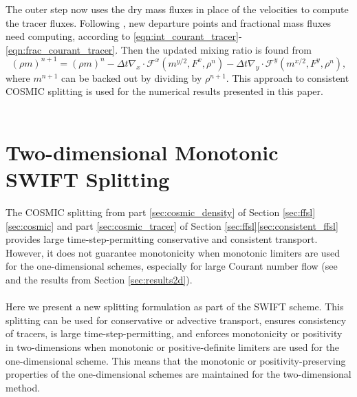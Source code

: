 \documentclass{ametsocV6.1}
\begin{document}
The outer step now uses the dry mass fluxes in place of the velocities to compute the tracer fluxes.
Following \citet{skamarock2006limiters}, new departure points and fractional mass fluxes need computing, according to \eqref{eqn:int_courant_tracer}-\eqref{eqn:frac_courant_tracer}.
Then the updated mixing ratio is found from
\begin{equation} \label{eqn:cosmic_tracer_end}
   (\rho m)^{n+1} = (\rho m)^{n} - \Delta{t} \nabla_x\cdot \mathcal{F}^x(m^{y/2},F^x,\rho^n) - \Delta{t} \nabla_y\cdot \mathcal{F}^y(m^{x/2},F^y,\rho^n),
\end{equation}
where $m^{n+1}$ can be backed out by dividing by $\rho^{n+1}$. This approach to consistent COSMIC splitting is used for the numerical results presented in this paper. \\
\\


\section{Two-dimensional Monotonic SWIFT Splitting} \label{sec:swift_splitting} 

The COSMIC splitting from part \ref{sec:cosmic_density} of Section \ref{sec:ffsl}\ref{sec:cosmic} and part \ref{sec:cosmic_tracer} of Section \ref{sec:ffsl}\ref{sec:consistent_ffsl} provides large time-step-permitting conservative and consistent transport. However, it does not guarantee monotonicity when monotonic limiters are used for the one-dimensional schemes, especially for large Courant number flow (see \citep{leonard1996cosmic,lin1996ffsl,bott2010improving} and the results from Section \ref{sec:results2d}). \\
\\
Here we present a new splitting formulation as part of the SWIFT scheme. This splitting can be used for conservative or advective transport, ensures consistency of tracers, is large time-step-permitting, and enforces monotonicity or positivity in two-dimensions when monotonic or positive-definite limiters are used for the one-dimensional scheme. This means that the monotonic or positivity-preserving properties of the one-dimensional schemes are maintained for the two-dimensional method. 
\end{document}
